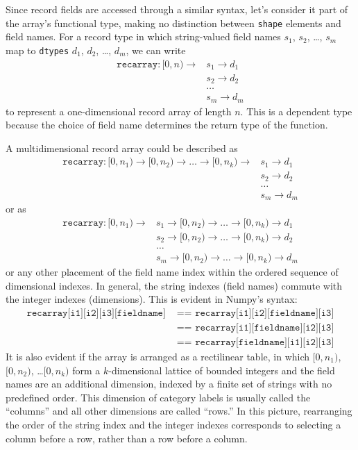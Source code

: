 \documentclass[12pt]{article}
\begin{document}
Since record fields are accessed through a similar syntax, let's consider it part of the array's functional type, making no distinction between \texttt{shape} elements and field names. For a record type in which string-valued field names $s_1$, $s_2$, \ldots, $s_m$ map to \texttt{dtypes} $d_1$, $d_2$, \ldots, $d_m$, we can write
\begin{align*}
\texttt{recarray}: [0, n) \to & s_1 \to d_1 \\
 & s_2 \to d_2 \\
 & \ldots \\
 & s_m \to d_m
\end{align*}
\noindent to represent a one-dimensional record array of length $n$. This is a dependent type because the choice of field name determines the return type of the function.

A multidimensional record array could be described as
\begin{align*}
\texttt{recarray}: [0, n_1) \to [0, n_2) \to \ldots \to [0, n_k) \to & s_1 \to d_1 \\
 & s_2 \to d_2 \\
 & \ldots \\
 & s_m \to d_m
\end{align*}
\noindent or as
\begin{align*}
\texttt{recarray}: [0, n_1) \to & s_1 \to [0, n_2) \to \ldots \to [0, n_k) \to d_1 \\
 & s_2 \to [0, n_2) \to \ldots \to [0, n_k) \to d_2 \\
 & \ldots \\
 & s_m \to [0, n_2) \to \ldots \to [0, n_k) \to d_m
\end{align*}
\noindent or any other placement of the field name index within the ordered sequence of dimensional indexes. In general, the string indexes (field names) commute with the integer indexes (dimensions). This is evident in Numpy's syntax:
\begin{align*}
\texttt{recarray[i1][i2][i3][fieldname]} & \texttt{ == recarray[i1][i2][fieldname][i3]} \\
 & \texttt{ == recarray[i1][fieldname][i2][i3]} \\
 & \texttt{ == recarray[fieldname][i1][i2][i3]}
\end{align*}
\noindent It is also evident if the array is arranged as a rectilinear table, in which $[0, n_1)$, $[0, n_2)$, \ldots $[0, n_k)$ form a $k$-dimensional lattice of bounded integers and the field names are an additional dimension, indexed by a finite set of strings with no predefined order. This dimension of category labels is usually called the ``columns'' and all other dimensions are called ``rows.'' In this picture, rearranging the order of the string index and the integer indexes corresponds to selecting a column before a row, rather than a row before a column.
\end{document}
